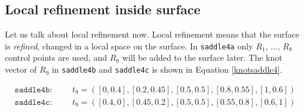 \documentclass{article}
\begin{document}
\subsection{Local refinement inside surface}

\vspace{6pt}

Let us talk about local refinement now. Local refinement means that the surface is \emph{refined}, changed in a local space on the surface. In \texttt{saddle4a} only $R_1$, ..., $R_8$ control points are used, and $R_9$ will be added to the surface later. The knot vector of $R_9$ in \texttt{saddle4b} and \texttt{saddle4c} is shown in Equation \ref{knotsaddle4}.

\begin{equation}
\begin{split}
\texttt{saddle4b}: \phantom{ww} & t_{9} = ([0, 0.4], [0.2, 0.45], [0.5, 0.5], [0.8, 0.55], [1, 0.6]) \\
\texttt{saddle4c}: \phantom{ww} & t_{9} = ([0.4, 0], [0.45, 0.2], [0.5, 0.5], [0.55, 0.8], [0.6, 1])
\end{split}
\label{knotsaddle4}
\end{equation}
\end{document}
